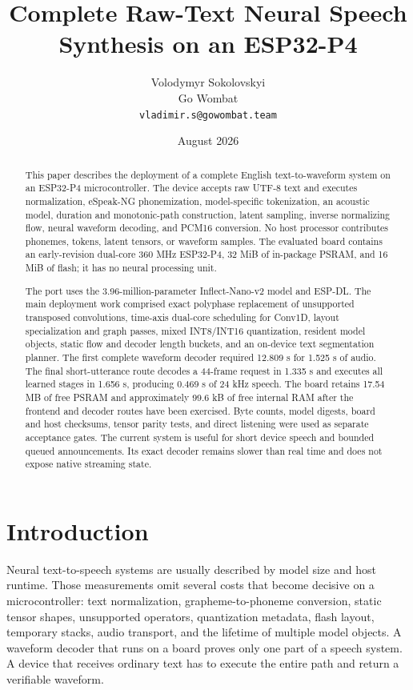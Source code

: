 \documentclass[10pt]{article}
\title{Complete Raw-Text Neural Speech Synthesis on an ESP32-P4}
\author{
  Volodymyr Sokolovskyi\\
  Go Wombat\\
  \texttt{vladimir.s@gowombat.team}
}
\date{August 2026}
\begin{document}
\maketitle

\begin{abstract}
This paper describes the deployment of a complete English text-to-waveform
system on an ESP32-P4 microcontroller. The device accepts raw UTF-8 text and
executes normalization, eSpeak-NG phonemization, model-specific tokenization,
an acoustic model, duration and monotonic-path construction, latent sampling,
inverse normalizing flow, neural waveform decoding, and PCM16 conversion.
No host processor contributes phonemes, tokens, latent tensors, or waveform
samples. The evaluated board contains an early-revision dual-core 360 MHz
ESP32-P4, 32 MiB of in-package PSRAM, and 16 MiB of flash; it has no neural
processing unit.

The port uses the 3.96-million-parameter Inflect-Nano-v2 model and ESP-DL.
The main deployment work comprised exact polyphase replacement of unsupported
transposed convolutions, time-axis dual-core scheduling for Conv1D, layout
specialization and graph passes, mixed INT8/INT16 quantization, resident model
objects, static flow and decoder length buckets, and an on-device text
segmentation planner. The first complete waveform decoder required
12.809 s for 1.525 s of audio. The final short-utterance route decodes a
44-frame request in 1.335 s and executes all learned stages in 1.656 s,
producing 0.469 s of 24 kHz speech. The board retains 17.54 MB of free PSRAM
and approximately 99.6 kB of free internal RAM after the frontend and decoder
routes have been exercised. Byte counts, model digests, board and host
checksums, tensor parity tests, and direct listening were used as separate
acceptance gates. The current system is useful for short device speech and
bounded queued announcements. Its exact decoder remains slower than real time
and does not expose native streaming state.
\end{abstract}

\section{Introduction}

Neural text-to-speech systems are usually described by model size and host
runtime. Those measurements omit several costs that become decisive on a
microcontroller: text normalization, grapheme-to-phoneme conversion, static
tensor shapes, unsupported operators, quantization metadata, flash layout,
temporary stacks, audio transport, and the lifetime of multiple model
objects. A waveform decoder that runs on a board proves only one part of a
speech system. A device that receives ordinary text has to execute the entire
path and return a verifiable waveform.
\end{document}
